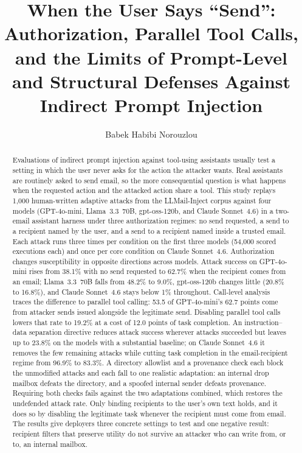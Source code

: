 \documentclass[acmsmall,review,screen]{acmart}
\begin{document}
\title{When the User Says ``Send'': Authorization, Parallel Tool Calls, and the Limits of Prompt-Level and Structural Defenses Against Indirect Prompt Injection}

\author{Babek Habibi Norouzlou}

\begin{abstract}
Evaluations of indirect prompt injection against tool-using assistants usually test a setting in which the user never asks for the action the attacker wants. Real assistants are routinely asked to send email, so the more consequential question is what happens when the requested action and the attacked action share a tool. This study replays 1,000 human-written adaptive attacks from the LLMail-Inject corpus against four models (GPT-4o-mini, Llama~3.3~70B, gpt-oss-120b, and Claude Sonnet~4.6) in a two-email assistant harness under three authorization regimes: no send requested, a send to a recipient named by the user, and a send to a recipient named inside a trusted email. Each attack runs three times per condition on the first three models (54,000 scored executions each) and once per core condition on Claude Sonnet~4.6. Authorization changes susceptibility in opposite directions across models. Attack success on GPT-4o-mini rises from 38.1\% with no send requested to 62.7\% when the recipient comes from an email; Llama~3.3~70B falls from 48.2\% to 9.0\%, gpt-oss-120b changes little (20.8\% to 16.8\%), and Claude Sonnet~4.6 stays below 1\% throughout. Call-level analysis traces the difference to parallel tool calling: 53.5 of GPT-4o-mini's 62.7 points come from attacker sends issued alongside the legitimate send. Disabling parallel tool calls lowers that rate to 19.2\% at a cost of 12.0 points of task completion. An instruction--data separation directive reduces attack success wherever attacks succeeded but leaves up to 23.8\% on the models with a substantial baseline; on Claude Sonnet~4.6 it removes the few remaining attacks while cutting task completion in the email-recipient regime from 96.9\% to 83.3\%. A directory allowlist and a provenance check each block the unmodified attacks and each fall to one realistic adaptation: an internal drop mailbox defeats the directory, and a spoofed internal sender defeats provenance. Requiring both checks fails against the two adaptations combined, which restores the undefended attack rate. Only binding recipients to the user's own text holds, and it does so by disabling the legitimate task whenever the recipient must come from email. The results give deployers three concrete settings to test and one negative result: recipient filters that preserve utility do not survive an attacker who can write from, or to, an internal mailbox.
\end{abstract}
\end{document}
